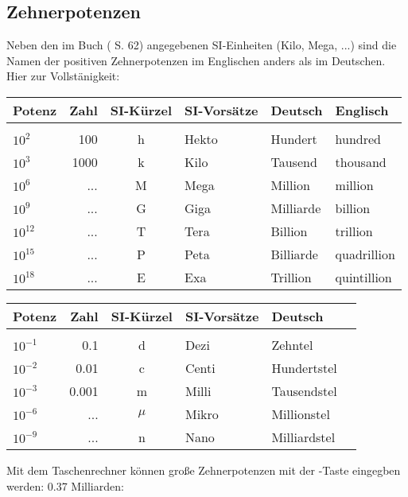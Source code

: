 \subsection{Zehnerpotenzen}


Neben den im Buch (\cite{marthaler21alg} S. 62) angegebenen SI-Einheiten (Kilo, Mega, ...) sind die
Namen der positiven Zehnerpotenzen im Englischen anders als im
Deutschen. Hier zur Vollstänigkeit:

\begin{tabular}{lrclll}
Potenz    & Zahl & SI-Kürzel & SI-Vorsätze & Deutsch & Englisch\\
\hline\\
$10^{2}$   & 100  & h         & Hekto       & Hundert   & hundred\\
$10^{3}$   & 1000 & k         & Kilo        & Tausend   & thousand\\
$10^{6}$   & ...  & M         & Mega        & Million   & million\\
$10^{9}$   & ...  & G         & Giga        & Milliarde & billion\\
$10^{12}$  & ...  & T         & Tera        & Billion   & trillion\\
$10^{15}$  & ...  & P         & Peta        & Billiarde & quadrillion\\
$10^{18}$  & ...  & E         & Exa         & Trillion  & quintillion\\
\end{tabular}

\begin{tabular}{lrclll}
Potenz     & Zahl & SI-Kürzel & SI-Vorsätze & Deutsch\\
\hline\\
$10^{-1}$  & 0.1   & d         & Dezi        & Zehntel\\
$10^{-2}$  & 0.01  & c         & Centi       & Hundertstel\\
$10^{-3}$  & 0.001 & m         & Milli       & Tausendstel\\
$10^{-6}$  & ...   & $\mu$     & Mikro       & Millionstel\\
$10^{-9}$  & ...   & n         & Nano        & Milliardstel\\
\end{tabular}

Mit dem Taschenrechner können große Zehnerpotenzen mit der
  -Taste eingegben
  werden: 0.37 Milliarden:

